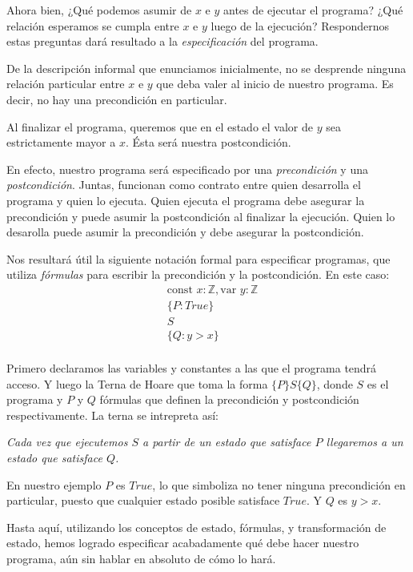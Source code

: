 \documentclass[12pt, a4paper, openany, fleqn]{book}
\newcommand{\declConst}[2]{\text{const } #1 : #2}
\newcommand{\declVar}[2]{\text{var } #1 : #2}
\begin{document}
    Ahora bien, ¿Qué podemos asumir de $x$ e $y$ antes de ejecutar el programa? ¿Qué relación esperamos se cumpla entre $x$ e $y$ luego de la ejecución? Respondernos estas preguntas dará resultado a la \textit{especificación} del programa.

    De la descripción informal que enunciamos inicialmente, no se desprende ninguna relación particular entre $x$ e $y$ que deba valer al inicio de nuestro programa. Es decir, no hay una precondición en particular.

    Al finalizar el programa, queremos que en el estado el valor de $y$ sea estrictamente mayor a $x$. Ésta será nuestra postcondición.

    En efecto, nuestro programa será especificado por una \textit{precondición} y una \textit{postcondición}. Juntas, funcionan como contrato entre quien desarrolla el programa y quien lo ejecuta. Quien ejecuta el programa debe asegurar la precondición y puede asumir la postcondición al finalizar la ejecución. Quien lo desarolla puede asumir la precondición y debe asegurar la postcondición.

    Nos resultará útil la siguiente notación formal para especificar programas, que utiliza \textit{fórmulas} para escribir la precondición y la postcondición. En este caso:
    \begin{align*}
        & \declConst{x}{\mathbb{Z}}, \declVar{y}{\mathbb{Z}}\\
        & \{P: True\} \\
        & S \\
        & \{Q: y > x\}\\
    \end{align*}

    Primero declaramos las variables y constantes a las que el programa tendrá acceso. Y luego la Terna de Hoare que toma la forma $\{P\}S\{Q\}$, donde $S$ es el programa y $P$ y $Q$ fórmulas que definen la precondición y postcondición respectivamente. La terna se intrepreta así: 
    \begin{center}
        \textit{Cada vez que ejecutemos $S$ a partir de un estado que satisface $P$ llegaremos a un estado que satisface $Q$.}
    \end{center}
    

    En nuestro ejemplo $P$ es $True$, lo que simboliza no tener ninguna precondición en particular, puesto que cualquier estado posible satisface $True$. Y $Q$ es $y > x$.

    Hasta aquí, utilizando los conceptos de estado, fórmulas, y transformación de estado, hemos logrado especificar acabadamente qué debe hacer nuestro programa, aún sin hablar en absoluto de cómo lo hará.
\end{document}
